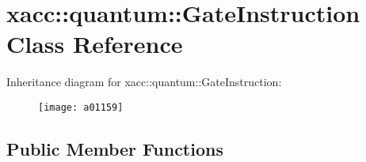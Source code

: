\hypertarget{a01159}{}\section{xacc\+:\+:quantum\+:\+:Gate\+Instruction Class Reference}
\label{a01159}
Inheritance diagram for xacc\+:\+:quantum\+:\+:Gate\+Instruction\+:\begin{figure}[H]
\begin{center}
\leavevmode
\texttt{[image: a01159]}
\end{center}
\end{figure}
\subsection*{Public Member Functions}
